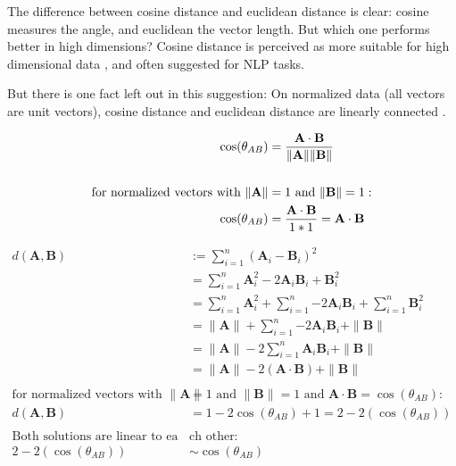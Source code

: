 		The difference between cosine distance and euclidean distance is clear: cosine measures the angle, and euclidean the vector length. But which one performs better in high dimensions? Cosine distance is perceived as more suitable for high dimensional data \cite[c.2.1.2.1]{40algorithms}, and often suggested for \ac{NLP} tasks. 
		
		But there is one fact left out in this suggestion: On normalized data (all vectors are unit vectors), cosine distance and euclidean distance are linearly connected \cite{khanRelationshipCosineSimilarity2020}.
		
		\begin{align*}
			\cos(\theta_{AB}) &= {\mathbf{A} \cdot \mathbf{B} \over \|\mathbf{A}\| \|\mathbf{B}\|}  \\
			\\
			\text{for normalized vectors with } \|\mathbf{A}\| &=1 \text{ and } \|\mathbf{B}\| =1: \\
			\cos(\theta_{AB}) &=  {\mathbf{A} \cdot \mathbf{B} \over 1 * 1 } = \mathbf{A} \cdot \mathbf{B}
		\end{align*}
		
		\begin{align*}
			d(\mathbf{A}, \mathbf{B}) &:=  \sum\limits_{i=1}^{n}{(\mathbf{A}_i -  \mathbf{B}_i)^{2}} \\
			&= \sum\limits_{i=1}^{n}{\mathbf{A}_i^{2} - 2\mathbf{A}_i\mathbf{B}_i + \mathbf{B}_i^2}  \\ 
			&= \sum\limits_{i=1}^{n}{\mathbf{A}_i^{2}} + \sum\limits_{i=1}^{n}{- 2\mathbf{A}_i\mathbf{B}_i} + \sum\limits_{i=1}^{n}{\mathbf{B}_i^2} \\
			&= 	\|\mathbf{A}\| + \sum\limits_{i=1}^{n}{- 2\mathbf{A}_i\mathbf{B}_i} + \|\mathbf{B}\| \\
			&= \|\mathbf{A}\| -2 \sum\limits_{i=1}^{n}{\mathbf{A}_i\mathbf{B}_i} + \|\mathbf{B}\| \\
			&= \|\mathbf{A}\| -2 (\mathbf{A} \cdot \mathbf{B}) + \|\mathbf{B}\| \\
			\\
			\text{for normalized vectors with }\|\mathbf{A}\| &=1 \text{ and } \|\mathbf{B}\| =1  \text{ and } \mathbf{A} \cdot \mathbf{B}  = \cos(\theta_{AB}):\\
			d(\mathbf{A}, \mathbf{B}) &= 1 - 2 \cos(\theta_{AB}) + 1 = 2 - 2(\cos(\theta_{AB})) \\
			\\
			\text{Both solutions are linear to ea}& \text{ch other:} \\
			2 - 2(\cos(\theta_{AB})) &\sim \cos(\theta_{AB})
		\end{align*}
	
